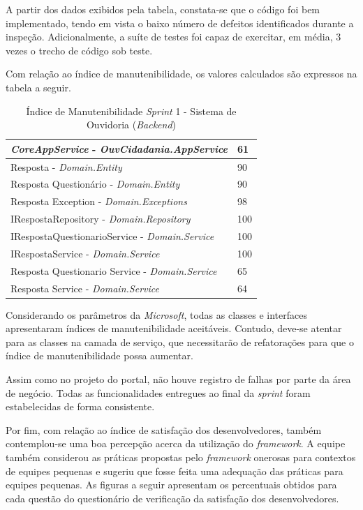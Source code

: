 A partir dos dados exibidos pela tabela, constata-se que o código foi bem implementado, tendo em vista o baixo número de defeitos identificados durante a inspeção. Adicionalmente, a suíte de testes foi capaz de exercitar, em média, 3 vezes o trecho de código sob teste.

Com relação ao índice de manutenibilidade, os valores calculados são expressos na tabela a seguir.

\begin{table}[h]
\centering
\begin{tabular}{ | m{12cm} | m{4cm} | } 
\hline
\textit{CoreAppService} - \textit{OuvCidadania.AppService} & 61 \\ 
\hline
Resposta - \textit{Domain.Entity} & 90 \\ 
\hline
Resposta Questionário - \textit{Domain.Entity} & 90 \\ 
\hline
Resposta Exception - \textit{Domain.Exceptions} & 98 \\ 
\hline
IRespostaRepository - \textit{Domain.Repository} & 100 \\
\hline
IRespostaQuestionarioService - \textit{Domain.Service} & 100 \\
\hline
IRespostaService - \textit{Domain.Service} & 100 \\
\hline
Resposta Questionario Service - \textit{Domain.Service} & 65 \\
\hline
Resposta Service - \textit{Domain.Service} & 64 \\
\hline
\end{tabular}
\caption{Índice de Manutenibilidade \textit{Sprint} 1 - Sistema de Ouvidoria (\textit{Backend})}\label{table:1}
\end{table}

Considerando os parâmetros da \textit{Microsoft}, todas as classes e interfaces apresentaram índices de manutenibilidade aceitáveis. Contudo, deve-se atentar para as classes na camada de serviço, que necessitarão de refatorações para que o índice de manutenibilidade possa aumentar.

Assim como no projeto do portal, não houve registro de falhas por parte da área de negócio. Todas as funcionalidades entregues ao final da \textit{sprint} foram estabelecidas de forma consistente.

Por fim, com relação ao índice de satisfação dos desenvolvedores, também contemplou-se uma boa percepção acerca da utilização do \textit{framework}. A equipe também considerou as práticas propostas pelo \textit{framework} onerosas para contextos de equipes pequenas e sugeriu que fosse feita uma adequação das práticas para equipes pequenas. As figuras a seguir apresentam os percentuais obtidos para cada questão do questionário de verificação da satisfação dos desenvolvedores.

